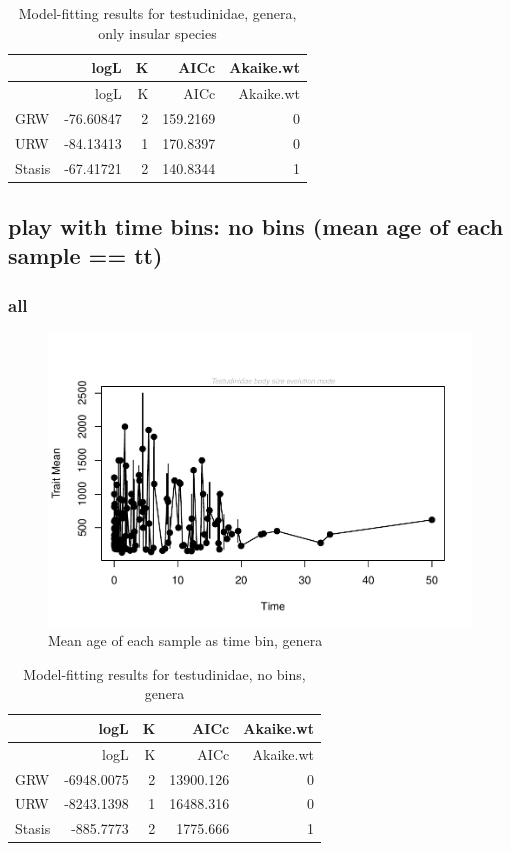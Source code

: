 \documentclass[]{article}
\begin{document}
\begin{longtable}[]{@{}lrrrr@{}}
\caption{Model-fitting results for testudinidae, genera, only insular
species}\tabularnewline
\toprule
& logL & K & AICc & Akaike.wt\tabularnewline
\midrule
\endfirsthead
\toprule
& logL & K & AICc & Akaike.wt\tabularnewline
\midrule
\endhead
GRW & -76.60847 & 2 & 159.2169 & 0\tabularnewline
URW & -84.13413 & 1 & 170.8397 & 0\tabularnewline
Stasis & -67.41721 & 2 & 140.8344 & 1\tabularnewline
\bottomrule
\end{longtable}

\newpage

\subsection{play with time bins: no bins (mean age of each sample ==
tt)}\label{play-with-time-bins-no-bins-mean-age-of-each-sample-tt}

\subsubsection{all}\label{all-1}

\begin{figure}[htbp]
\centering
\includegraphics{MA_JJ_files/figure-latex/paleoTS with different time bins, no bins, genera-1.pdf}
\caption{Mean age of each sample as time bin, genera}
\end{figure}

\begin{longtable}[]{@{}lrrrr@{}}
\caption{Model-fitting results for testudinidae, no bins,
genera}\tabularnewline
\toprule
& logL & K & AICc & Akaike.wt\tabularnewline
\midrule
\endfirsthead
\toprule
& logL & K & AICc & Akaike.wt\tabularnewline
\midrule
\endhead
GRW & -6948.0075 & 2 & 13900.126 & 0\tabularnewline
URW & -8243.1398 & 1 & 16488.316 & 0\tabularnewline
Stasis & -885.7773 & 2 & 1775.666 & 1\tabularnewline
\bottomrule
\end{longtable}
\end{document}
